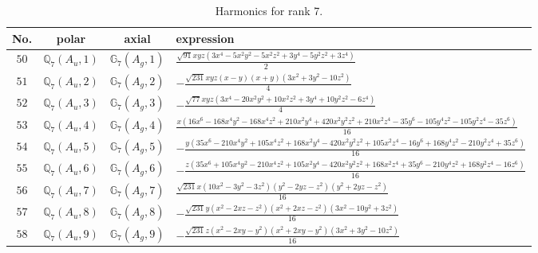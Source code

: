 \documentclass[fleqn,8pt,landscape]{jsarticle}
\begin{document}
\begin{table}[ht!]
\begin{center}
\caption{Harmonics for rank 7.}
\renewcommand{\arraystretch}{1.3}
\begin{tabular}{cccl} \hline \hline
No. & polar & axial & expression \\ \hline
$ 50 $ & $ \mathbb{Q}_{7}(A_{u},1) $ & $ \mathbb{G}_{7}(A_{g},1) $ & $ \frac{\sqrt{91} x y z \left(3 x^{4} - 5 x^{2} y^{2} - 5 x^{2} z^{2} + 3 y^{4} - 5 y^{2} z^{2} + 3 z^{4}\right)}{2} $ \\
$ 51 $ & $ \mathbb{Q}_{7}(A_{u},2) $ & $ \mathbb{G}_{7}(A_{g},2) $ & $ - \frac{\sqrt{231} x y z \left(x - y\right) \left(x + y\right) \left(3 x^{2} + 3 y^{2} - 10 z^{2}\right)}{4} $ \\
$ 52 $ & $ \mathbb{Q}_{7}(A_{u},3) $ & $ \mathbb{G}_{7}(A_{g},3) $ & $ - \frac{\sqrt{77} x y z \left(3 x^{4} - 20 x^{2} y^{2} + 10 x^{2} z^{2} + 3 y^{4} + 10 y^{2} z^{2} - 6 z^{4}\right)}{4} $ \\
$ 53 $ & $ \mathbb{Q}_{7}(A_{u},4) $ & $ \mathbb{G}_{7}(A_{g},4) $ & $ \frac{x \left(16 x^{6} - 168 x^{4} y^{2} - 168 x^{4} z^{2} + 210 x^{2} y^{4} + 420 x^{2} y^{2} z^{2} + 210 x^{2} z^{4} - 35 y^{6} - 105 y^{4} z^{2} - 105 y^{2} z^{4} - 35 z^{6}\right)}{16} $ \\
$ 54 $ & $ \mathbb{Q}_{7}(A_{u},5) $ & $ \mathbb{G}_{7}(A_{g},5) $ & $ - \frac{y \left(35 x^{6} - 210 x^{4} y^{2} + 105 x^{4} z^{2} + 168 x^{2} y^{4} - 420 x^{2} y^{2} z^{2} + 105 x^{2} z^{4} - 16 y^{6} + 168 y^{4} z^{2} - 210 y^{2} z^{4} + 35 z^{6}\right)}{16} $ \\
$ 55 $ & $ \mathbb{Q}_{7}(A_{u},6) $ & $ \mathbb{G}_{7}(A_{g},6) $ & $ - \frac{z \left(35 x^{6} + 105 x^{4} y^{2} - 210 x^{4} z^{2} + 105 x^{2} y^{4} - 420 x^{2} y^{2} z^{2} + 168 x^{2} z^{4} + 35 y^{6} - 210 y^{4} z^{2} + 168 y^{2} z^{4} - 16 z^{6}\right)}{16} $ \\
$ 56 $ & $ \mathbb{Q}_{7}(A_{u},7) $ & $ \mathbb{G}_{7}(A_{g},7) $ & $ \frac{\sqrt{231} x \left(10 x^{2} - 3 y^{2} - 3 z^{2}\right) \left(y^{2} - 2 y z - z^{2}\right) \left(y^{2} + 2 y z - z^{2}\right)}{16} $ \\
$ 57 $ & $ \mathbb{Q}_{7}(A_{u},8) $ & $ \mathbb{G}_{7}(A_{g},8) $ & $ - \frac{\sqrt{231} y \left(x^{2} - 2 x z - z^{2}\right) \left(x^{2} + 2 x z - z^{2}\right) \left(3 x^{2} - 10 y^{2} + 3 z^{2}\right)}{16} $ \\
$ 58 $ & $ \mathbb{Q}_{7}(A_{u},9) $ & $ \mathbb{G}_{7}(A_{g},9) $ & $ - \frac{\sqrt{231} z \left(x^{2} - 2 x y - y^{2}\right) \left(x^{2} + 2 x y - y^{2}\right) \left(3 x^{2} + 3 y^{2} - 10 z^{2}\right)}{16} $ \\

\end{tabular}
\end{center}
\end{table}
\end{document}
